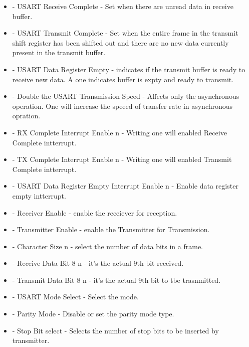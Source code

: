 \begin{itemize}
    \item {} - USART Receive Complete - Set when there are unread data in receive buffer.
    \item {} - USART Transmit Complete - Set when the entire frame in the transmit shift register has been shifted out and there are no new data currently present in the transmit buffer.
    \item {} - USART Data Register Empty - indicates if the transmit buffer is ready to receive new data. A one indicates buffer is expty and ready to transmit.
    \item {} - Double the USART Transmission Speed - Affects only the asynchronous operation. One will increase the speeed of transfer rate in asynchronous opration.
    \item {} - RX Complete Interrupt Enable n - Writing one will enabled Receive Complete intterrupt.
    \item {} - TX Complete Interrupt Enable n - Writing one will enabled Transmit Complete intterrupt.
    \item {} - USART Data Register Empty Interrupt Enable n - Enable data register empty intterrupt.
    \item {} - Receiver Enable - enable the receiever for reception.
    \item {} - Transmitter Enable - enable the Transmitter for Transmission.
    \item {} - Character Size n - select the number of data bits in a frame.
    \item {} - Receive Data Bit 8 n - it's the actual 9th bit received.
    \item {} - Transmit Data Bit 8 n -  it's the actual 9th bit to tbe trasnmitted.
    \item {} - USART Mode Select - Select the mode.
    \item {} - Parity Mode - Disable or set the parity mode type.
    \item {} - Stop Bit select - Selects the number of stop bits to be inserted by transmitter.
\end{itemize}

